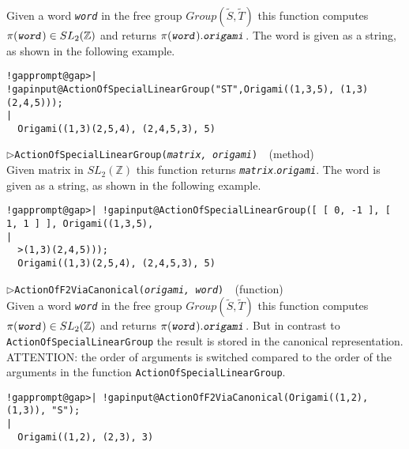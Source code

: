 \documentclass[a4paper,11pt]{report}
\begin{document}
{{{ Given a word \mbox{\texttt{\mdseries\slshape word}} in the free group $Group(\tilde{S}, \tilde{T})$ this function computes $\pi(\mbox{\texttt{\mdseries\slshape word}}) \in SL_2(\mathbb{Z})$ and returns $\pi(\mbox{\texttt{\mdseries\slshape word}}).\mbox{\texttt{\mdseries\slshape origami}}$. The word is given as a string, as shown in the following example. 
\begin{Verbatim}[commandchars=!@|,fontsize=\small,frame=single,label=Example]
  !gapprompt@gap>| !gapinput@ActionOfSpecialLinearGroup("ST",Origami((1,3,5), (1,3)(2,4,5)));
|
  Origami((1,3)(2,5,4), (2,4,5,3), 5)
\end{Verbatim}
 \noindent\textcolor{FuncColor}{$\triangleright$\enspace\texttt{ActionOfSpecialLinearGroup({\mdseries\slshape matrix, origami})
\label{ActionOfSpecialLinearGroup}
}\hfill{\scriptsize (method)}}\\


 Given matrix in $SL_2(\mathbb{Z}) $ this function returns \mbox{\texttt{\mdseries\slshape matrix}}.\mbox{\texttt{\mdseries\slshape origami}}. The word is given as a string, as shown in the following example. 
\begin{Verbatim}[commandchars=!@|,fontsize=\small,frame=single,label=Example]
  !gapprompt@gap>| !gapinput@ActionOfSpecialLinearGroup([ [ 0, -1 ], [ 1, 1 ] ], Origami((1,3,5), 
|
  >(1,3)(2,4,5))); 
  Origami((1,3)(2,5,4), (2,4,5,3), 5)
\end{Verbatim}
 \noindent\textcolor{FuncColor}{$\triangleright$\enspace\texttt{ActionOfF2ViaCanonical({\mdseries\slshape origami, word})
\label{ActionOfF2ViaCanonical}
}\hfill{\scriptsize (function)}}\\


 Given a word \mbox{\texttt{\mdseries\slshape word}} in the free group $Group(\tilde{S}, \tilde{T})$ this function computes $\pi(\mbox{\texttt{\mdseries\slshape word}}) \in SL_2(\mathbb{Z})$ and returns $\pi(\mbox{\texttt{\mdseries\slshape word}}).\mbox{\texttt{\mdseries\slshape origami}}$. But in contrast to \texttt{ActionOfSpecialLinearGroup} the result is stored in the canonical representation. ATTENTION: the order of
arguments is switched compared to the order of the arguments in the function \texttt{ActionOfSpecialLinearGroup}. 
\begin{Verbatim}[commandchars=!@|,fontsize=\small,frame=single,label=Example]
  !gapprompt@gap>| !gapinput@ActionOfF2ViaCanonical(Origami((1,2), (1,3)), "S");
|
  Origami((1,2), (2,3), 3)
    

\end{Verbatim}}}}
\end{document}
